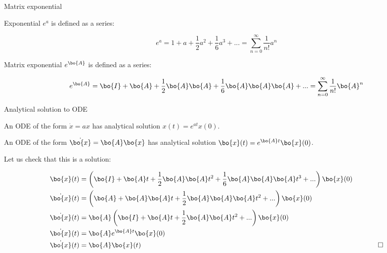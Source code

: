 \documentclass{beamer}
\begin{document}
\begin{frame}{Matrix exponential}
	\begin{flushleft}
		
		Exponential $e^a$ is defined as a series:
		
		\begin{equation}
			e^a =1+a+\frac{1}{2} a^2
			+\frac{1}{6} a^3 + ... = \sum_{n=0}^{\infty} \frac{1}{n!} a^n
		\end{equation}
		
		Matrix exponential $e^\bo{A}$ is defined as a series:
		
		\begin{equation}
			e^\bo{A} = \bo{I}+\bo{A}+\frac{1}{2} \bo{A}\bo{A}
			+\frac{1}{6} \bo{A}\bo{A}\bo{A} + ... = \sum_{n=0}^{\infty} \frac{1}{n!} \bo{A}^n
		\end{equation}
		
		
	\end{flushleft}
\end{frame}




\begin{frame}{Analytical solution to ODE}
	\begin{flushleft}
		
		An ODE of the form $\dot x = a x$ has analytical solution $x(t) = e^{at} x(0)$.
		
		\bigskip
		
		An ODE of the form $\dot{\bo{x}} = \bo{A}  \bo{x}$ has analytical solution $\bo{x}(t) = e^{\bo{A}t}  \bo{x}(0)$.
		
		\bigskip
		
		Let us check that this is a solution:
		
		\begin{align}
			\bo{x}(t) &= \left( \bo{I}+\bo{A}t+\frac{1}{2} \bo{A}\bo{A}t^2
			+\frac{1}{6} \bo{A}\bo{A}\bo{A}t^3 + ... \right)  \bo{x}(0) &
			\\
			\dot{\bo{x}}(t) &= \left( \bo{A}+\bo{A}\bo{A}t
			+\frac{1}{2}\bo{A}\bo{A}\bo{A}t^2 + ... \right)  \bo{x}(0) 	&		
			\\
			\dot{\bo{x}}(t) &= \bo{A} \left(\bo{I} +\bo{A}t
			+\frac{1}{2}\bo{A}\bo{A}t^2 + ... \right)  \bo{x}(0) 	&		
			\\
			\dot{\bo{x}}(t) &= \bo{A} e^{\bo{A}t}  \bo{x}(0) 	&		 			
			\\
			\dot{\bo{x}}(t) &= \bo{A} \bo{x}(t)  &\ \ \qed
		\end{align}
		
		
		
	\end{flushleft}
\end{frame}
\end{document}
